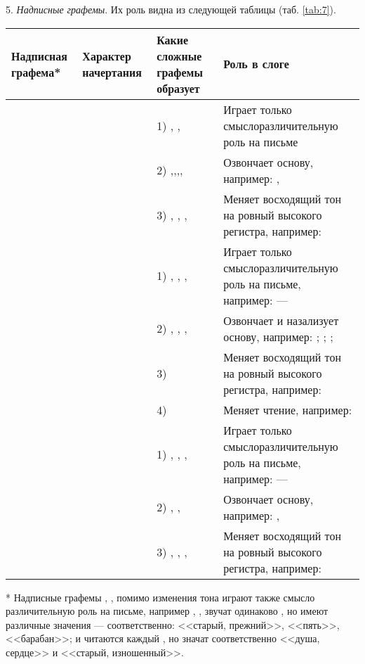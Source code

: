 5. \emph{Надписные графемы}. Их роль видна из следующей таблицы (таб. \ref{tab:7}).

\begin{tabularx}{\textwidth}{|L{4}|L{4}|L{7}|L{14}|}
	\caption{Надписные графемы}\label{tab:7}\\
	\hline
	Над\-пис\-ная графема* & Характер начертания & Какие сложные графемы образует & Роль в слоге\\
	\hline
	\endhead
	 &  & 1) , ,  & Играет только смыслоразличительную роль на письме\\
	& & 2) ,,,, & Озвончает основу, например: , \\
	& & 3) , , ,  & Меняет восходящий тон на ровный высокого регистра, например: \\
	\hline
	 &  & 1) , , ,  & Играет только смыслоразличительную роль на письме, например:  --- \\
	& & 2) , , ,  & Озвончает и назализует основу, например: ; ; ; \\
	& & 3)  & Меняет восходящий тон на ровный высокого регистра, например: \\
	& & 4)  & Меняет чтение, например: \\
	\hline
	 &  & 1) , , ,  & Играет только смыслоразличительную роль на письме, например:  --- \\
	& & 2) , ,  & Озвончает основу, например: , \\
	& & 3) , , ,  & Меняет восходящий тон на ровный высокого регистра, например: \\
	\hline
\end{tabularx}
{\footnotesize{* Надписные графемы , ,  помимо изменения тона играют также смысло различительную роль на письме, например , ,  звучат одинаково , но имеют различные значения --- соответственно: <<старый, прежний>>, <<пять>>, <<барабан>>;  и  читаются каждый , но значат соответственно <<душа, сердце>> и <<старый, изношенный>>.}}

